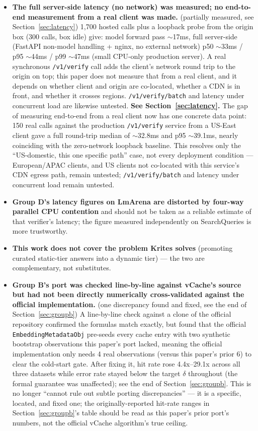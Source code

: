 \documentclass[11pt]{article}
\begin{document}
\begin{itemize}[leftmargin=*]
  \item \textbf{The full server-side latency (no network) was measured; no end-to-end measurement from a real client was made.} (partially measured, see Section~\ref{sec:latency}) 1{,}700 hosted calls plus a loopback probe from the origin box (300 calls, box idle) give: model forward pass $\sim$17ms, full server-side (FastAPI non-model handling + nginx, no external network) p50 $\sim$33ms / p95 $\sim$44ms / p99 $\sim$47ms (small CPU-only production server). A real synchronous \texttt{/\allowbreak{}v1/\allowbreak{}verify} call adds the client's network round trip to the origin on top; this paper does not measure that from a real client, and it depends on whether client and origin are co-located, whether a CDN is in front, and whether it crosses regions. \texttt{/\allowbreak{}v1/\allowbreak{}verify/\allowbreak{}batch} and latency under concurrent load are likewise untested. \textbf{See Section~\ref{sec:latency}.} The gap of measuring end-to-end from a real client now has one concrete data point: 150 real calls against the production \texttt{/\allowbreak{}v1/\allowbreak{}verify} service from a US-East client gave a full round-trip median of $\sim$32.8ms and p95 $\sim$39.1ms, nearly coinciding with the zero-network loopback baseline. This resolves only the ``US-domestic, this one specific path'' case, not every deployment condition --- European/APAC clients, and US clients not co-located with this service's CDN egress path, remain untested; \texttt{/\allowbreak{}v1/\allowbreak{}verify/\allowbreak{}batch} and latency under concurrent load remain untested.
  \item \textbf{Group D's latency figures on LmArena are distorted by four-way parallel CPU contention} and should not be taken as a reliable estimate of that verifier's latency; the figure measured independently on SearchQueries is more trustworthy.
  \item \textbf{This work does not cover the problem Krites solves} (promoting curated static-tier answers into a dynamic tier) --- the two are complementary, not substitutes.
  \item \textbf{Group B's port was checked line-by-line against vCache's source but had not been directly numerically cross-validated against the official implementation.} (one discrepancy found and fixed, see the end of Section~\ref{sec:groupb}) A line-by-line check against a clone of the official repository confirmed the formulas match exactly, but found that the official \texttt{Embedding\allowbreak{}Metadata\allowbreak{}Obj} pre-seeds every cache entry with two synthetic bootstrap observations this paper's port lacked, meaning the official implementation only needs 4 real observations (versus this paper's prior 6) to clear the cold-start gate. After fixing it, hit rate rose 4.4x--29.1x across all three datasets while error rate stayed below the target $\delta$ throughout (the formal guarantee was unaffected); see the end of Section~\ref{sec:groupb}. This is no longer ``cannot rule out subtle porting discrepancies'' --- it is a specific, located, and fixed one; the originally-reported hit-rate ranges in Section~\ref{sec:groupb}'s table should be read as this paper's prior port's numbers, not the official vCache algorithm's true ceiling.

\end{itemize}
\end{document}

